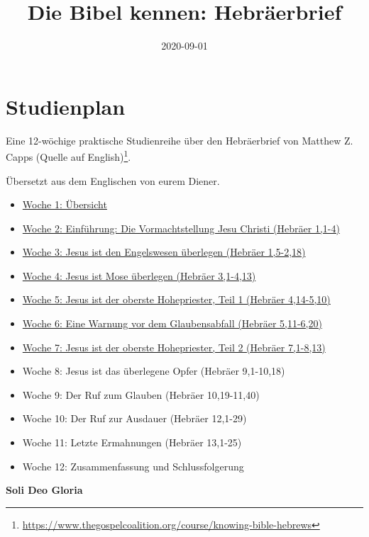 \documentclass[
  12pt,
]{krantz}
\title{Die Bibel kennen: Hebräerbrief}
\author{}
\date{\vspace{-2.5em}2020-09-01}
\makeatletter
\providecommand{\tightlist}{%
  \setlength{\itemsep}{0pt}\setlength{\parskip}{0pt}}
\newenvironment{kframe}{%
\medskip{}
\setlength{\fboxsep}{.8em}
 \def\at@end@of@kframe{}%
 \ifinner\ifhmode%
  \def\at@end@of@kframe{\end{minipage}}%
  \begin{minipage}{\columnwidth}%
 \fi\fi%
 \def\FrameCommand##1{\hskip\@totalleftmargin \hskip-\fboxsep
 \colorbox{shadecolor}{##1}\hskip-\fboxsep
     \hskip-\linewidth \hskip-\@totalleftmargin \hskip\columnwidth}%
 \MakeFramed {\advance\hsize-\width
   \@totalleftmargin\z@ \linewidth\hsize
   \@setminipage}}%
 {\par\unskip\endMakeFramed%
 \at@end@of@kframe}
\newenvironment{rmdblock}[1]
  {
  \begin{itemize}
  \renewcommand{\labelitemi}{
    \raisebox{-.7\height}[0pt][0pt]{
      {\setkeys{Gin}{width=3em,keepaspectratio}\texttt{[image: img/\#1]}}
    }
  }
  \setlength{\fboxsep}{1em}
  \begin{kframe}
  \item
  }
  {
  \end{kframe}
  \end{itemize}
  }
\newenvironment{rmdinfo}
  {\begin{rmdblock}{caution}}
  {\end{rmdblock}}
\renewcommand{\href}[2]{#2\footnote{\url{#1}}}
\makeatother
\begin{document}
\maketitle

\thispagestyle{empty}
\mainmatter

{
\hypersetup{linkcolor=}
\setcounter{tocdepth}{2}
\tableofcontents
}
\hypertarget{studienplan}{%
\chapter{Studienplan}\label{studienplan}}

Eine 12-wöchige praktische Studienreihe über den Hebräerbrief
von Matthew Z. Capps \href{https://www.thegospelcoalition.org/course/knowing-bible-hebrews}{(Quelle auf English)}.

Übersetzt aus dem Englischen von eurem Diener.

\begin{itemize}
\tightlist
\item
  \protect\hyperlink{woche01}{Woche 1: Übersicht}
\item
  \protect\hyperlink{woche02}{Woche 2: Einführung: Die Vormachtstellung Jesu Christi (Hebräer 1,1-4)}
\item
  \protect\hyperlink{woche03}{Woche 3: Jesus ist den Engelswesen überlegen (Hebräer 1,5-2,18)}
\item
  \protect\hyperlink{woche04}{Woche 4: Jesus ist Mose überlegen (Hebräer 3,1-4,13)}
\item
  \protect\hyperlink{woche05}{Woche 5: Jesus ist der oberste Hohepriester, Teil 1 (Hebräer 4,14-5,10)}
\item
  \protect\hyperlink{woche06}{Woche 6: Eine Warnung vor dem Glaubensabfall (Hebräer 5,11-6,20)}
\item
  \protect\hyperlink{woche07}{Woche 7: Jesus ist der oberste Hohepriester, Teil 2 (Hebräer 7,1-8,13)}
\item
  Woche 8: Jesus ist das überlegene Opfer (Hebräer 9,1-10,18)
\item
  Woche 9: Der Ruf zum Glauben (Hebräer 10,19-11,40)
\item
  Woche 10: Der Ruf zur Ausdauer (Hebräer 12,1-29)
\item
  Woche 11: Letzte Ermahnungen (Hebräer 13,1-25)
\item
  Woche 12: Zusammenfassung und Schlussfolgerung
\end{itemize}

\begin{rmdinfo}
\textbf{Soli Deo Gloria}
\end{rmdinfo}
\end{document}
